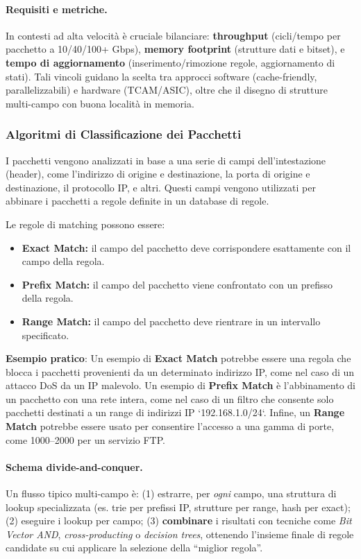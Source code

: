 \paragraph{Requisiti e metriche.}
In contesti ad alta velocità è cruciale bilanciare: \textbf{throughput} (cicli/tempo per pacchetto a 10/40/100+ Gbps), \textbf{memory footprint} (strutture dati e bitset), e \textbf{tempo di aggiornamento} (inserimento/rimozione regole, aggiornamento di stati). Tali vincoli guidano la scelta tra approcci software (cache-friendly, parallelizzabili) e hardware (TCAM/ASIC), oltre che il disegno di strutture multi-campo con buona località in memoria.

\subsubsection{Algoritmi di Classificazione dei Pacchetti}
I pacchetti vengono analizzati in base a una serie di campi dell'intestazione (header), come l'indirizzo di origine e destinazione, la porta di origine e destinazione, il protocollo IP, e altri. Questi campi vengono utilizzati per abbinare i pacchetti a regole definite in un database di regole.

Le regole di matching possono essere:
\begin{itemize}
  \item \textbf{Exact Match:} il campo del pacchetto deve corrispondere esattamente con il campo della regola.
  \item \textbf{Prefix Match:} il campo del pacchetto viene confrontato con un prefisso della regola.
  \item \textbf{Range Match:} il campo del pacchetto deve rientrare in un intervallo specificato.
\end{itemize}

\textbf{Esempio pratico}:
Un esempio di \textbf{Exact Match} potrebbe essere una regola che blocca i pacchetti provenienti da un determinato indirizzo IP, come nel caso di un attacco DoS
da un IP malevolo. Un esempio di \textbf{Prefix Match}
è l'abbinamento di un pacchetto con una rete intera,
come nel caso di un filtro che consente solo pacchetti destinati a
un range di indirizzi IP `192.168.1.0/24`. Infine, un \textbf{Range Match}
potrebbe essere usato per consentire l'accesso a una gamma di porte, come 1000–2000 per un servizio FTP.

\paragraph{Schema divide-and-conquer.}
Un flusso tipico multi-campo è: (1) estrarre, per \emph{ogni} campo, una struttura di lookup specializzata (es. trie per prefissi IP, strutture per range, hash per exact); (2) eseguire i lookup per campo; (3) \textbf{combinare} i risultati con tecniche come \emph{Bit Vector AND}, \emph{cross-producting} o \emph{decision trees}, ottenendo l'insieme finale di regole candidate su cui applicare la selezione della “miglior regola”.

